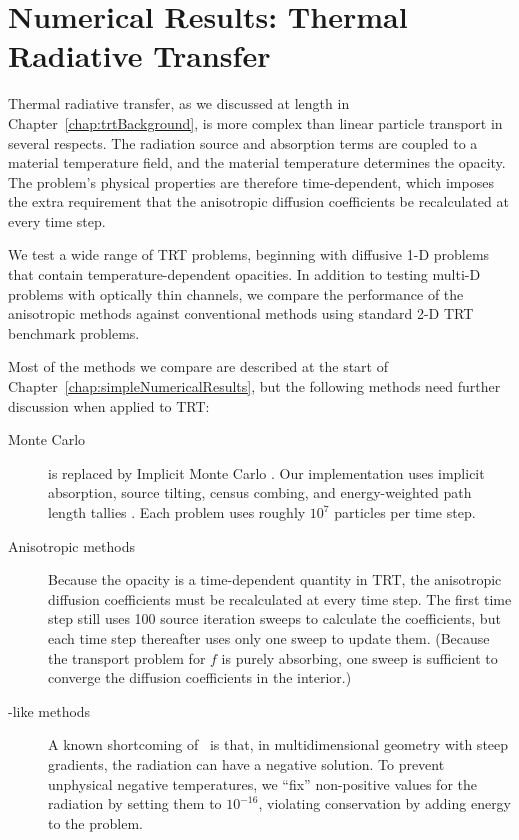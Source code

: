
\chapter{Numerical Results: Thermal Radiative Transfer}
\label{chap:trtNumericalResults}

Thermal radiative transfer, as we discussed at length in
Chapter~\ref{chap:trtBackground}, is more complex than linear particle transport
in several respects. The radiation source and absorption terms are coupled to a
material temperature field, and the material temperature determines the opacity.
The problem's physical properties are therefore time-dependent, which
imposes the extra requirement that the anisotropic diffusion coefficients be
recalculated at every time step.

We test a wide range of TRT problems, beginning with diffusive 1-D problems that
contain temperature-dependent opacities. In addition to testing multi-D problems
with optically thin channels, we compare the performance of the anisotropic
methods against conventional methods using standard 2-D TRT benchmark problems.

Most of the methods we compare are described at the start of
Chapter~\ref{chap:simpleNumericalResults}, but the following methods need
further discussion when applied to TRT:
\begin{description}

  \item[Monte Carlo] is replaced by Implicit Monte Carlo \cite{Fle1971}. Our
    implementation uses implicit absorption, source tilting, census combing, and
    energy-weighted path length tallies \cite{Urb2006}. Each problem uses
    roughly $10^7$ particles per time step.

  \item[Anisotropic methods] Because the opacity is a time-dependent quantity
in TRT, the anisotropic diffusion coefficients must be recalculated at every
time step. The first time step still uses 100 source iteration sweeps to
calculate the coefficients, but each time step thereafter uses only one sweep to
update them. (Because the transport problem for $f$ is purely absorbing, one
sweep is sufficient to converge the diffusion coefficients in the interior.)

  \item[\Pone-like methods] A known shortcoming of \Pone\ is that, in
    multidimensional geometry with steep gradients, the radiation can have a
    negative solution. To prevent unphysical negative temperatures, we
    ``fix'' non-positive values for the radiation by setting them
    to $10^{-16}$, violating conservation by adding energy to the problem.

\end{description}

